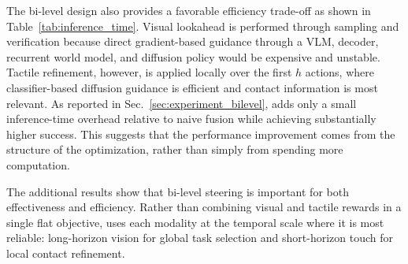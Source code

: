 The bi-level design also provides a favorable efficiency trade-off as shown in Table~\ref{tab:inference_time}. Visual lookahead is performed through sampling and verification because direct gradient-based guidance through a VLM, decoder, recurrent world model, and diffusion policy would be expensive and unstable. Tactile refinement, however, is applied locally over the first $h$ actions, where classifier-based diffusion guidance is efficient and contact information is most relevant. As reported in Sec.~\ref{sec:experiment_bilevel}, \ours{} adds only a small inference-time overhead relative to naive fusion while achieving substantially higher success. This suggests that the performance improvement comes from the structure of the optimization, rather than simply from spending more computation.

The additional results show that bi-level steering is important for both effectiveness and efficiency. Rather than combining visual and tactile rewards in a single flat objective, \ours{} uses each modality at the temporal scale where it is most reliable: long-horizon vision for global task selection and short-horizon touch for local contact refinement.

